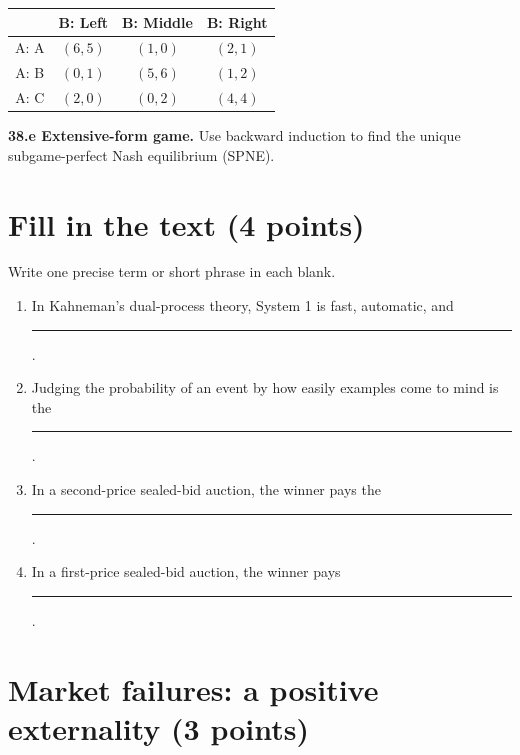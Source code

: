 \documentclass[11pt,a4paper]{article}
\newcommand{\answerline}{\rule{0.34\textwidth}{0.35pt}}
\begin{document}
\begin{center}
\renewcommand{\arraystretch}{1.45}
\begin{tabular}{c|c|c|c}
 & B: Left & B: Middle & B: Right \\ \hline
A: A & \((6,5)\) & \((1,0)\) & \((2,1)\)\\
A: B & \((0,1)\) & \((5,6)\) & \((1,2)\)\\
A: C & \((2,0)\) & \((0,2)\) & \((4,4)\)
\end{tabular}
\end{center}

\newpage
\textbf{38.e Extensive-form game.} Use backward induction to find the unique
subgame-perfect Nash equilibrium (SPNE).

\begin{center}
\end{center}

\vfill
\newpage
\section{Fill in the text \hfill (4 points)}

Write one precise term or short phrase in each blank.

\begin{enumerate}[label=\textbf{\alph*.},itemsep=1.2em]
  \item In Kahneman's dual-process theory, System 1 is fast, automatic, and
        \answerline.
  \item Judging the probability of an event by how easily examples come to
        mind is the \answerline.
  \item In a second-price sealed-bid auction, the winner pays the
        \answerline.
  \item In a first-price sealed-bid auction, the winner pays
        \answerline.
\end{enumerate}

\section{Market failures: a positive externality \hfill (3 points)}
\end{document}
